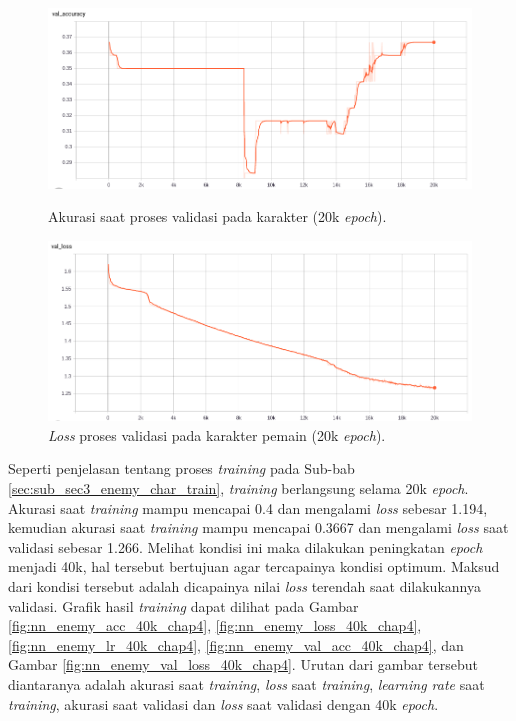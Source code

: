 \begin{figure} [!h] \centering
	\includegraphics[scale=0.42]{img/enemy_val_acc_chap4.png}
	\caption{Akurasi saat proses validasi pada karakter (20k \textit{epoch}).}
	\label{fig:nn_enemy_val_acc_chap4}
	\vspace{4ex}
	
	\includegraphics[scale=0.42]{img/enemy_val_loss_chap4.png}
	\caption{\textit{Loss} proses validasi pada karakter pemain (20k \textit{epoch}).}
	\label{fig:nn_enemy_val_loss_chap4}
	\vspace{-1ex}
\end{figure}

Seperti penjelasan tentang proses \textit{training} pada Sub-bab \ref{sec:sub_sec3_enemy_char_train}, \textit{training} berlangsung selama 20k \textit{epoch}. Akurasi saat \textit{training} mampu mencapai 0.4 dan mengalami \textit{loss} sebesar 1.194, kemudian akurasi saat \textit{training} mampu mencapai 0.3667 dan mengalami \textit{loss} saat validasi sebesar 1.266. Melihat kondisi ini maka dilakukan peningkatan \textit{epoch} menjadi 40k, hal tersebut bertujuan agar tercapainya kondisi optimum. Maksud dari kondisi tersebut adalah dicapainya nilai \textit{loss} terendah saat dilakukannya validasi. Grafik hasil \textit{training} dapat dilihat pada Gambar \ref{fig:nn_enemy_acc_40k_chap4}, \ref{fig:nn_enemy_loss_40k_chap4}, \ref{fig:nn_enemy_lr_40k_chap4}, \ref{fig:nn_enemy_val_acc_40k_chap4}, dan Gambar \ref{fig:nn_enemy_val_loss_40k_chap4}. Urutan dari gambar tersebut diantaranya adalah akurasi saat \textit{training}, \textit{loss} saat \textit{training}, \textit{learning rate} saat \textit{training}, akurasi saat validasi dan \textit{loss} saat validasi dengan 40k \textit{epoch}.

